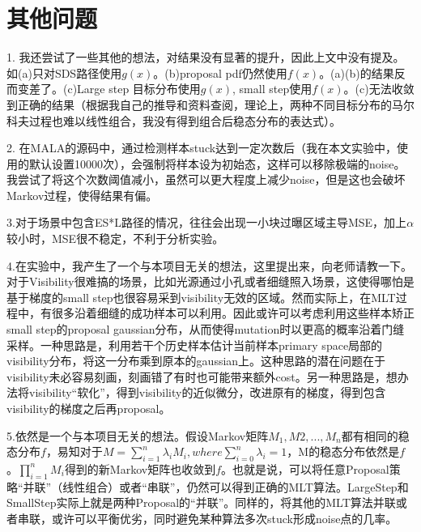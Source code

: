 \section{其他问题}
1. 我还尝试了一些其他的想法，对结果没有显著的提升，因此上文中没有提及。如(a)只对SDS路径使用$g(x)$。(b)proposal pdf仍然使用$f(x)$。(a)(b)的结果反而变差了。(c)Large step 目标分布使用$g(x)$, small step使用$f(x)$。(c)无法收敛到正确的结果（根据我自己的推导和资料查阅，理论上，两种不同目标分布的马尔科夫过程也难以线性组合，我没有得到组合后稳态分布的表达式）。

2. 在MALA的源码中，通过检测样本stuck达到一定次数后（我在本文实验中，使用的默认设置10000次），会强制将样本设为初始态，这样可以移除极端的noise。我尝试了将这个次数阈值减小，虽然可以更大程度上减少noise，但是这也会破坏Markov过程，使得结果有偏。

3.对于场景中包含ES*L路径的情况，往往会出现一小块过曝区域主导MSE，加上$\alpha$较小时，MSE很不稳定，不利于分析实验。

4.在实验中，我产生了一个与本项目无关的想法，这里提出来，向老师请教一下。对于Visibility很难搞的场景，比如光源通过小孔或者细缝照入场景，这使得哪怕是基于梯度的small step也很容易采到visibility无效的区域。然而实际上，在MLT过程中，有很多沿着细缝的成功样本可以利用。因此或许可以考虑利用这些样本矫正small step的proposal gaussian分布，从而使得mutation时以更高的概率沿着门缝采样。一种思路是，利用若干个历史样本估计当前样本primary space局部的visibility分布，将这一分布乘到原本的gaussian上。这种思路的潜在问题在于visibility未必容易刻画，刻画错了有时也可能带来额外cost。另一种思路是，想办法将visibility“软化”，得到visibility的近似微分，改进原有的梯度，得到包含visibility的梯度之后再proposal。

5.依然是一个与本项目无关的想法。假设Markov矩阵$M_1, M2, ...,M_n$都有相同的稳态分布$f$，易知对于$M=\sum_{i=1}^n \lambda_iM_i, where \sum_{i=0}^n \lambda_i = 1$，M的稳态分布依然是$f$。$\prod_{i=1}^n M_i$得到的新Markov矩阵也收敛到$f$。也就是说，可以将任意Proposal策略“并联”（线性组合）或者“串联”，仍然可以得到正确的MLT算法。LargeStep和SmallStep实际上就是两种Proposal的“并联”。同样的，将其他的MLT算法并联或者串联，或许可以平衡优劣，同时避免某种算法多次stuck形成noise点的几率。

\label{sec:otherTopic}